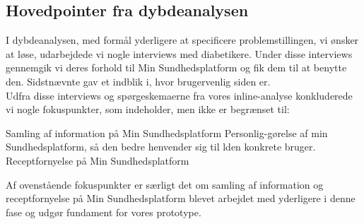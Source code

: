 \subsection{Hovedpointer fra dybdeanalysen}
I dybdeanalysen, med formål yderligere at specificere problemstillingen, vi ønsker at løse, udarbejdede vi nogle interviews med diabetikere. Under disse interviews gennemgik vi deres forhold til Min Sundhedsplatform og fik dem til at benytte den. Sidstnævnte gav et indblik i, hvor brugervenlig siden er.\\
Udfra disse interviews og spørgeskemaerne fra vores inline-analyse konkluderede vi nogle fokuspunkter, som indeholder, men ikke er begrænset til:
\begin{itemize}
  Samling af information på Min Sundhedsplatform
  Personlig-gørelse af min Sundhedsplatform, så den bedre henvender sig til lden konkrete bruger.
  Receptfornyelse på Min Sundhedsplatform
\end{itemize}
Af ovenstående fokuspunkter er særligt det om samling af information og receptfornyelse på Min Sundhedsplatform blevet arbejdet med yderligere i denne fase og udgør fundament for vores prototype. 
